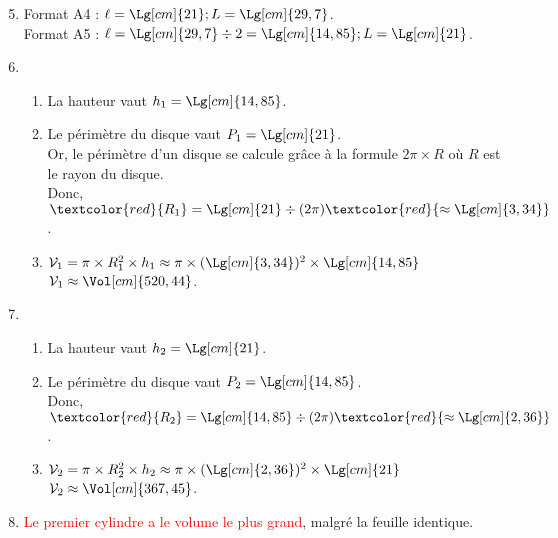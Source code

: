 \begin{corrige}   
\begin{enumerate}
   \setcounter{enumi}{4}
      \item Format A4 : \textcolor{red}{ $\ell =\Lg[cm]{21}; L=\Lg[cm]{29,7}$}. \\
         Format A5 : \textcolor{red}{ $\ell =\Lg[cm]{29,7}\div2 = \Lg[cm]{14,85}; L=\Lg[cm]{21}$}.
      \item
      \begin{enumerate}
         \item La hauteur vaut \textcolor{red}{ $h_1 =\Lg[cm]{14,85}$}.
         \item Le périmètre du disque vaut \textcolor{red}{ $P_1 =\Lg[cm]{21}$}. \\
         Or, le périmètre d'un disque se calcule grâce à la formule $2\pi\times R$ où $R$ est le rayon du disque. \\
            Donc,  $\textcolor{red}{ R_1} =\Lg[cm]{21}\div(2\pi) \textcolor{red}{ \approx\Lg[cm]{3,34}}$.
         \item $\mathcal{V}_1 =\pi\times R_1^2\times h_1 \approx\pi\times(\Lg[cm]{3,34})^2\times\Lg[cm]{14,85}$ \\
            \textcolor{red}{ $\mathcal{V}_1 \approx\Vol[cm]{520,44}$}.
      \end{enumerate}
      \setcounter{enumi}{6}
      \item
      \begin{enumerate}
         \item La hauteur vaut \textcolor{red}{ $h_2 =\Lg[cm]{21}$}.
         \item Le périmètre du disque vaut \textcolor{red}{ $P_2 =\Lg[cm]{14,85}$}. \\
            Donc,  $\textcolor{red}{ R_2} =\Lg[cm]{14,85}\div(2\pi) \textcolor{red}{ \approx\Lg[cm]{2,36}}$.
         \item $\mathcal{V}_2 =\pi\times R_2^2\times h_2 \approx\pi\times(\Lg[cm]{2,36})^2\times\Lg[cm]{21}$ \\
            \textcolor{red}{ $\mathcal{V}_2 \approx\Vol[cm]{367,45}$}.
      \end{enumerate}
      \setcounter{enumi}{7}
      \item \textcolor{red}{ Le premier cylindre a le volume le plus grand}, malgré la feuille identique.
   \end{enumerate}
\end{corrige}